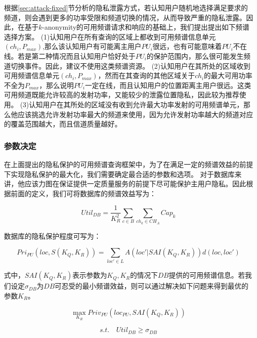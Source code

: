 根据\ref{sec:attack-fixed}节分析的隐私泄露方式，若认知用户随机地选择满足要求的频道，则会遇到更多的功率受限和频道切换的情况，从而导致严重的隐私泄露。因此，在基于$k$-anonymity的可用频谱请求和响应的基础上，我们提出提出如下频谱选择方案。
(1)认知用户在所有查询的区域上都收到可用频谱信息单元$(ch_{i},P_{max})$,那么该认知用户有可能离主用户$PU_{i}$很远，也有可能意味着$PU_{i}$不在线。若是第二种情况而且认知用户恰好处于$PU_{i}$的保护范围内，那么很可能发生频道切换事件。因此，建议不使用这类频谱资源。
(2)认知用户在其所处的区域收到可用频谱信息单元$(ch_{i},P_{max})$，然而在其查询的其他区域关于$ch_{i}$的最大可用功率不全为$P_{max}$，那么说明$PU_{i}$一定在线，而且认知用户的位置距离主用户很远。这类可用频道既能允许较高的发射功率，又能较少的泄露位置隐私，因此较为推荐使用。
(3)认知用户在其所处的区域没有收到允许最大功率发射的可用频谱单元，那么他应该挑选允许发射功率最大的频道来使用，因为允许发射功率越大的频道对应的覆盖范围越大，而且信道质量越好。

\subsubsection{参数决定}
在上面提出的隐私保护的可用频谱查询框架中，为了在满足一定的频谱效益的前提下实现隐私保护的最大化，我们需要确定最合适的参数和选项。
对于数据库来讲，他应该力图在保证提供一定质量服务的前提下尽可能保护主用户隐私。因此根据前面的定义，我们可将数据库的频谱效益写为：

\begin{equation}
Util_{DB}=\frac{1}{K_{R}^{2}}\sum\limits_{c \in B} \sum\limits_{ch_{k} \in CH_{A}} Cap_{k}
\end{equation}

数据库的隐私保护程度可写为：

\begin{equation}
Pri_{PU}(loc,S(K_{Q},K_{R}))=\sum\limits_{loc' \in L} A(loc'|SAI(K_{Q},K_{R}))d(loc,loc')
\end{equation}

式中，$SAI(K_{Q},K_{R})$表示参数为$K_{Q},K_{R}$的情况下$DB$提供的可用频谱信息。若我们设定$\sigma_{DB}$为$DB$可忍受的最小频谱效益，则可以通过解决如下问题来得到最优的参数$K_{R}$。

\begin{equation}
\max_{K_{R}} Priv_{PU}(loc_{PU},SAI(K_{Q},K_{R})) 
\end{equation}

\begin{equation}
s.t. \quad Util_{DB} \geq \sigma_{DB}
\end{equation}

